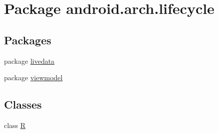 \hypertarget{namespaceandroid_1_1arch_1_1lifecycle}{}\section{Package android.\+arch.\+lifecycle}
\label{namespaceandroid_1_1arch_1_1lifecycle}
\subsection*{Packages}
\begin{DoxyCompactItemize}
\item 
package \mbox{\hyperlink{namespaceandroid_1_1arch_1_1lifecycle_1_1livedata}{livedata}}
\item 
package \mbox{\hyperlink{namespaceandroid_1_1arch_1_1lifecycle_1_1viewmodel}{viewmodel}}
\end{DoxyCompactItemize}
\subsection*{Classes}
\begin{DoxyCompactItemize}
\item 
class \mbox{\hyperlink{classandroid_1_1arch_1_1lifecycle_1_1_r}{R}}
\end{DoxyCompactItemize}
